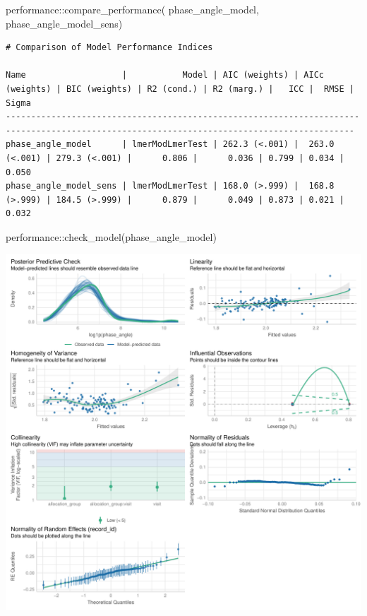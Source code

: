 \documentclass[
  12pt,
]{article}
\newenvironment{Shaded}{\begin{snugshade}}{\end{snugshade}}
\newcommand{\FunctionTok}[1]{\textcolor[rgb]{0.28,0.35,0.67}{#1}}
\newcommand{\NormalTok}[1]{\textcolor[rgb]{0.00,0.23,0.31}{#1}}
\newcommand{\SpecialCharTok}[1]{\textcolor[rgb]{0.37,0.37,0.37}{#1}}
\begin{document}
\begin{Shaded}
\begin{Highlighting}[]
\NormalTok{performance}\SpecialCharTok{::}\FunctionTok{compare\_performance}\NormalTok{(}
\NormalTok{    phase\_angle\_model, }
\NormalTok{    phase\_angle\_model\_sens)}
\end{Highlighting}
\end{Shaded}

\begin{verbatim}
# Comparison of Model Performance Indices

Name                   |           Model | AIC (weights) | AICc (weights) | BIC (weights) | R2 (cond.) | R2 (marg.) |   ICC |  RMSE | Sigma
-------------------------------------------------------------------------------------------------------------------------------------------
phase_angle_model      | lmerModLmerTest | 262.3 (<.001) |  263.0 (<.001) | 279.3 (<.001) |      0.806 |      0.036 | 0.799 | 0.034 | 0.050
phase_angle_model_sens | lmerModLmerTest | 168.0 (>.999) |  168.8 (>.999) | 184.5 (>.999) |      0.879 |      0.049 | 0.873 | 0.021 | 0.032
\end{verbatim}

\begin{Shaded}
\begin{Highlighting}[]
\NormalTok{performance}\SpecialCharTok{::}\FunctionTok{check\_model}\NormalTok{(phase\_angle\_model)}
\end{Highlighting}
\end{Shaded}

\includegraphics{Outcomes_files/figure-pdf/phase_angle_4-1.pdf}
\end{document}
